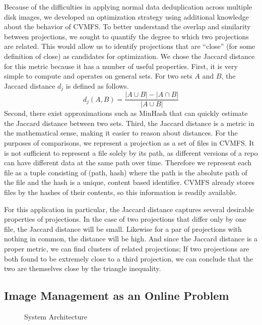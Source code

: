 \documentclass[conference]{IEEEtran}
\begin{document}
Because of the difficulties in applying normal data deduplication across multiple disk images,
we developed an optimization strategy using additional knowledge about the behavior of CVMFS.
To better understand the overlap and similarity between projections,
we sought to quantify the degree to which two projections are related.
This would allow us to identify projections that are ``close'' (for some definition of close) as candidates for optimization.
We chose the Jaccard distance for this metric because it has a number of useful properties.
First, it is very simple to compute and operates on general sets.
For two sets $A$ and $B$,
the Jaccard distance $d_j$ is defined as follows.
\[
d_j(A, B) = \frac{|A \cup B| - |A \cap B|}{|A \cup B|}
\]
Second, there exist approximations such as MinHash that can quickly estimate the Jaccard distance between two sets.
Third, the Jaccard distance is a metric in the mathematical sense,
making it easier to reason about distances.
For the purposes of comparisons,
we represent a projection as a set of files in CVMFS.
It is not sufficient to represent a file solely by its path,
as different versions of a repo can have different data at the same path over time.
Therefore we represent each file as a tuple consisting of (path, hash) where the path is the absolute path of the file and the hash is a unique, content based identifier.
CVMFS already stores files by the hashes of their contents,
so this information is readily available.

For this application in particular,
the Jaccard distance captures several desirable properties of projections.
In the case of two projections that differ only by one file,
the Jaccard distance will be small.
Likewise for a par of projections with nothing in common,
the distance will be high.
And since the Jaccard distance is a proper metric,
we can find clusters of related projections;
If two projections are both found to be extremely close to a third projection,
we can conclude that the two are themselves close by the triangle inequality.

\subsection{Image Management as an Online Problem}

\begin{figure}[t]
\centering
{}
\caption{System Architecture}
\label{figure:sys-arch}
\end{figure}
\end{document}
